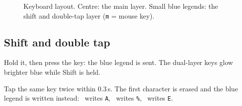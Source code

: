 \begin{figure}[H]
  \centering
  \caption{Keyboard layout. Centre: the main layer. Small blue legends: the shift and
           double-tap layer (\texttt{m} = mouse key).}
  \label{fig:keyboard}
\end{figure}


\subsection*{Shift and double tap}

\begin{description}[font=\normalfont\sffamily\bfseries, leftmargin=2.6cm, style=nextline]
  \item[\keycap{Shift}] Hold it, then press the key: the blue legend is sent. The dual-layer
        keys glow brighter blue while Shift is held.
  \item[Double tap] Tap the same key twice within 0.3\,s. The first character is erased and
        the blue legend is written instead: \, writes \texttt{A},
        \, writes \texttt{\%}, \, writes \texttt{E}.
\end{description}


